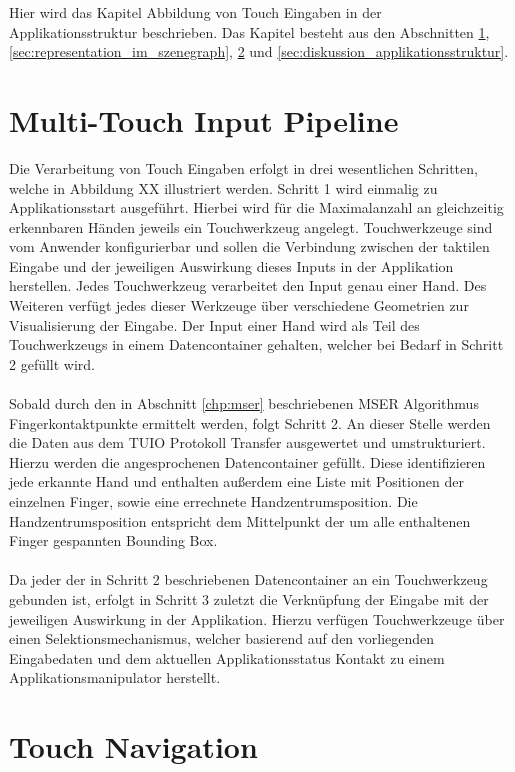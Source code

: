 Hier wird das Kapitel Abbildung von Touch Eingaben in der Applikationsstruktur beschrieben. Das Kapitel besteht aus den Abschnitten \ref{sec:multitouch_input_pipeline}, \ref{sec:representation_im_szenegraph}, \ref{sec:touch_navigation} und \ref{sec:diskussion_applikationsstruktur}.


\section{Multi-Touch Input Pipeline}
\label{sec:multitouch_input_pipeline}

Die Verarbeitung von Touch Eingaben erfolgt in drei wesentlichen Schritten, welche in Abbildung XX illustriert werden. Schritt 1 wird einmalig zu Applikationsstart ausgeführt. Hierbei wird für die Maximalanzahl an gleichzeitig erkennbaren Händen jeweils ein Touchwerkzeug angelegt. Touchwerkzeuge sind vom Anwender konfigurierbar und sollen die Verbindung zwischen der taktilen Eingabe und der jeweiligen Auswirkung dieses Inputs in der Applikation herstellen. Jedes Touchwerkzeug verarbeitet den Input genau einer Hand. Des Weiteren verfügt jedes dieser Werkzeuge über verschiedene Geometrien zur Visualisierung der Eingabe. Der Input einer Hand wird als Teil des Touchwerkzeugs in einem Datencontainer gehalten, welcher bei Bedarf in Schritt 2 gefüllt wird.
\\\\
Sobald durch den in Abschnitt \ref{chp:mser} beschriebenen MSER Algorithmus Fingerkontaktpunkte ermittelt werden, folgt Schritt 2. An dieser Stelle werden die Daten aus dem TUIO Protokoll Transfer ausgewertet und umstrukturiert. Hierzu werden die angesprochenen Datencontainer gefüllt. Diese identifizieren jede erkannte Hand und enthalten außerdem eine Liste mit Positionen der einzelnen Finger, sowie eine errechnete Handzentrumsposition. Die Handzentrumsposition entspricht dem Mittelpunkt der um alle enthaltenen Finger gespannten Bounding Box.
\\\\
Da jeder der in Schritt 2 beschriebenen Datencontainer an ein Touchwerkzeug gebunden ist, erfolgt in Schritt 3 zuletzt die Verknüpfung der Eingabe mit der jeweiligen Auswirkung in der Applikation. Hierzu verfügen Touchwerkzeuge über einen Selektionsmechanismus, welcher basierend auf den vorliegenden Eingabedaten und dem aktuellen Applikationsstatus Kontakt zu einem Applikationsmanipulator herstellt.



\section{Touch Navigation}
\label{sec:touch_navigation}

